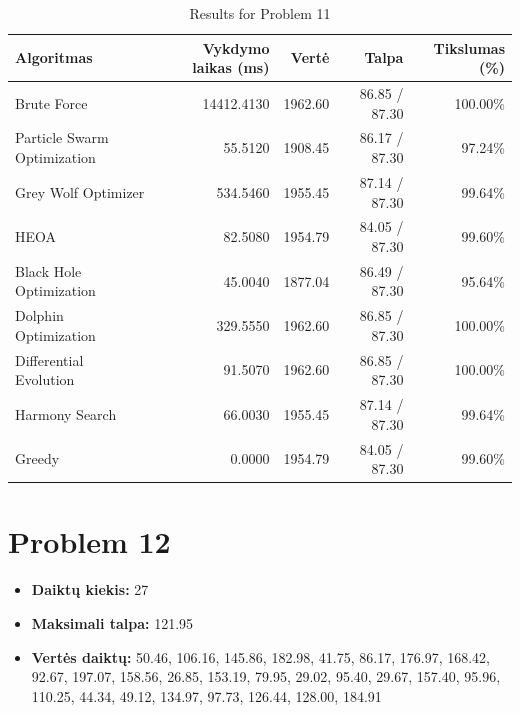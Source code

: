 \documentclass[a4paper,11pt]{article}
\begin{document}
\begin{table}[h!]
\centering
\begin{tabular}{lrrrr}
\toprule
\textbf{Algoritmas} & \textbf{Vykdymo laikas (ms)} & \textbf{Vertė} & \textbf{Talpa} & \textbf{Tikslumas (\%)} \\
\midrule
Brute Force & 14412.4130 & 1962.60 & 86.85 / 87.30 & 100.00\% \\
Particle Swarm Optimization & 55.5120 & 1908.45 & 86.17 / 87.30 & 97.24\% \\
Grey Wolf Optimizer & 534.5460 & 1955.45 & 87.14 / 87.30 & 99.64\% \\
HEOA & 82.5080 & 1954.79 & 84.05 / 87.30 & 99.60\% \\
Black Hole Optimization & 45.0040 & 1877.04 & 86.49 / 87.30 & 95.64\% \\
Dolphin Optimization & 329.5550 & 1962.60 & 86.85 / 87.30 & 100.00\% \\
Differential Evolution & 91.5070 & 1962.60 & 86.85 / 87.30 & 100.00\% \\
Harmony Search & 66.0030 & 1955.45 & 87.14 / 87.30 & 99.64\% \\
Greedy & 0.0000 & 1954.79 & 84.05 / 87.30 & 99.60\% \\
\bottomrule
\end{tabular}
\caption{Results for Problem 11}
\end{table}
\clearpage

\section*{Problem 12}
\begin{itemize}
    \item \textbf{Daiktų kiekis:} 27
    \item \textbf{Maksimali talpa:} 121.95
    \item \textbf{Vertės daiktų:} 50.46, 106.16, 145.86, 182.98, 41.75, 86.17, 176.97, 168.42, 92.67, 197.07, 158.56, 26.85, 153.19, 79.95, 29.02, 95.40, 29.67, 157.40, 95.96, 110.25, 44.34, 49.12, 134.97, 97.73, 126.44, 128.00, 184.91
\end{itemize}
\end{document}
